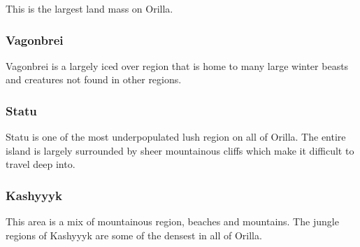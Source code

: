 This is the largest land mass on Orilla.


\subsubsection{Vagonbrei}

Vagonbrei is a largely iced over region that is home to many large winter beasts and creatures not found in other regions.

\subsubsection{Statu}

Statu is one of the most underpopulated lush region on all of Orilla. The entire island is largely surrounded by sheer mountainous cliffs which make it difficult to travel deep into. 



\subsubsection{Kashyyyk}

This area is a mix of mountainous region, beaches and mountains. The jungle regions of Kashyyyk are some of the densest in all of Orilla.



